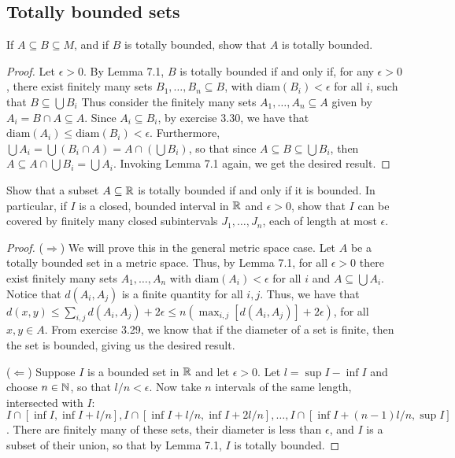 \subsection{Totally bounded sets}


\begin{exercise}{1}
If $A\subseteq B\subseteq M$, and if $B$ is totally bounded, show that $A$ is totally bounded.
\end{exercise}
\begin{proof}
Let $\epsilon>0$.
By Lemma 7.1, $B$ is totally bounded if and only if, for any $\epsilon>0$, there exist finitely many sets $B_1,\dots,B_n\subseteq B$, with $\text{diam}(B_i)<\epsilon$ for all $i$, such that $B\subseteq \bigcup B_i$
Thus consider the finitely many sets $A_1,\dots,A_n\subseteq A$ given by $A_i = B\cap A \subseteq A$.
Since $A_i\subseteq B_i$, by exercise 3.30, we have that $\text{diam}(A_i)\leq \text{diam}(B_i)< \epsilon$.
Furthermore, $\bigcup A_i = \bigcup (B_i\cap A) = A\cap(\bigcup B_i)$, so that since $A\subseteq B\subseteq \bigcup B_i$, then $A\subseteq A\cap \bigcup B_i = \bigcup A_i$.
Invoking Lemma 7.1 again, we get the desired result.
\end{proof} 

\begin{exercise}{2}
Show that a subset $A\subseteq \mathbb{R}$ is totally bounded if and only if it is bounded.
In particular, if $I$ is a closed, bounded interval in $\mathbb{R}$ and $\epsilon>0$, show that $I$ can be covered by finitely many closed subintervals $J_1,\dots,J_n$, each of length at most $\epsilon$.
\end{exercise}
\begin{proof}
($\Rightarrow$)
We will prove this in the general metric space case.
Let $A$ be a totally bounded set in a metric space.
Thus, by Lemma 7.1, for all $\epsilon>0$ there exist finitely many sets $A_1,\dots,A_n$ with $\text{diam}(A_i) < \epsilon$ for all $i$ and $A\subseteq\bigcup A_i$.
Notice that $d(A_i,A_j)$ is a finite quantity for all $i,j$.
Thus, we have that $d(x,y)\leq \sum_{i,j}d(A_i,A_j)+2\epsilon \leq n(\max_{i,j}[d(A_i,A_j)]+ 2\epsilon)$, for all $x,y\in A$.
From exercise 3.29, we know that if the diameter of a set is finite, then the set is bounded, giving us the desired result.

($\Leftarrow$)
Suppose $I$ is a bounded set in $\mathbb{R}$ and let $\epsilon>0$.
Let $l = \sup I-\inf I$ and choose $n\in\mathbb{N}$, so that $l/n<\epsilon$.
Now take $n$ intervals of the same length, intersected with $I$: $I\cap [\inf I, \inf I+l/n], I\cap [\inf I+l/n, \inf I +2l/n],\dots, I\cap [\inf I +(n-1)l/n, \sup I]$.
There are finitely many of these sets, their diameter is less than $\epsilon$, and $I$ is a subset of their union, so that by Lemma 7.1, $I$ is totally bounded.
\end{proof} 

